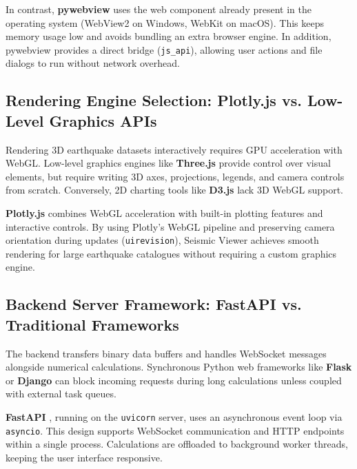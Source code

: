 In contrast, \textbf{pywebview} \cite{pywebview} uses the web component already present in the operating system (WebView2 on Windows, WebKit on macOS). This keeps memory usage low and avoids bundling an extra browser engine. In addition, pywebview provides a direct bridge (\texttt{js\_api}), allowing user actions and file dialogs to run without network overhead.

\subsection{Rendering Engine Selection: Plotly.js vs. Low-Level Graphics APIs}

Rendering 3D earthquake datasets interactively requires GPU acceleration with WebGL. Low-level graphics engines like \textbf{Three.js} provide control over visual elements, but require writing 3D axes, projections, legends, and camera controls from scratch. Conversely, 2D charting tools like \textbf{D3.js} lack 3D WebGL support.

\textbf{Plotly.js} \cite{plotlyjs} combines WebGL acceleration with built-in plotting features and interactive controls. By using Plotly's WebGL pipeline and preserving camera orientation during updates (\texttt{uirevision}), Seismic Viewer achieves smooth rendering for large earthquake catalogues without requiring a custom graphics engine.

\subsection{Backend Server Framework: FastAPI vs. Traditional Frameworks}

The backend transfers binary data buffers and handles WebSocket messages alongside numerical calculations. Synchronous Python web frameworks like \textbf{Flask} or \textbf{Django} can block incoming requests during long calculations unless coupled with external task queues.

\textbf{FastAPI} \cite{fastapi}, running on the \texttt{uvicorn} \cite{uvicorn} server, uses an asynchronous event loop via \texttt{asyncio}. This design supports WebSocket communication and HTTP endpoints within a single process. Calculations are offloaded to background worker threads, keeping the user interface responsive.

